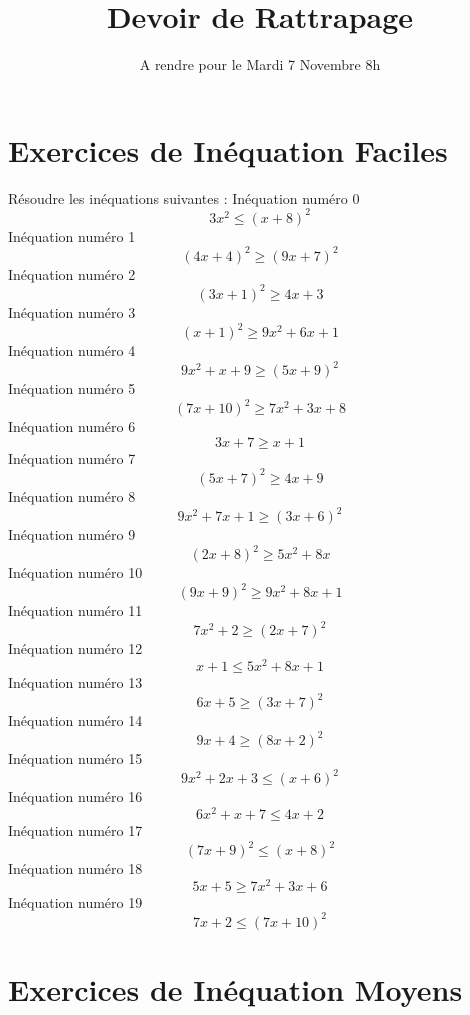 \documentclass{article}
\title{Devoir de Rattrapage}
\date{A rendre pour le Mardi 7 Novembre 8h}\usepackage{natbib}
\begin{document}
\maketitle
 \section{Exercices de In\'equation Faciles}

 R\'esoudre les in\'equations suivantes : 
In\'equation num\'ero 0 \[3 x^{2} \leq \left(x + 8\right)^{2}\]In\'equation num\'ero 1 \[\left(4 x + 4\right)^{2} \geq \left(9 x + 7\right)^{2}\]In\'equation num\'ero 2 \[\left(3 x + 1\right)^{2} \geq 4 x + 3\]In\'equation num\'ero 3 \[\left(x + 1\right)^{2} \geq 9 x^{2} + 6 x + 1\]In\'equation num\'ero 4 \[9 x^{2} + x + 9 \geq \left(5 x + 9\right)^{2}\]In\'equation num\'ero 5 \[\left(7 x + 10\right)^{2} \geq 7 x^{2} + 3 x + 8\]In\'equation num\'ero 6 \[3 x + 7 \geq x + 1\]In\'equation num\'ero 7 \[\left(5 x + 7\right)^{2} \geq 4 x + 9\]In\'equation num\'ero 8 \[9 x^{2} + 7 x + 1 \geq \left(3 x + 6\right)^{2}\]In\'equation num\'ero 9 \[\left(2 x + 8\right)^{2} \geq 5 x^{2} + 8 x\]In\'equation num\'ero 10 \[\left(9 x + 9\right)^{2} \geq 9 x^{2} + 8 x + 1\]In\'equation num\'ero 11 \[7 x^{2} + 2 \geq \left(2 x + 7\right)^{2}\]In\'equation num\'ero 12 \[x + 1 \leq 5 x^{2} + 8 x + 1\]In\'equation num\'ero 13 \[6 x + 5 \geq \left(3 x + 7\right)^{2}\]In\'equation num\'ero 14 \[9 x + 4 \geq \left(8 x + 2\right)^{2}\]In\'equation num\'ero 15 \[9 x^{2} + 2 x + 3 \leq \left(x + 6\right)^{2}\]In\'equation num\'ero 16 \[6 x^{2} + x + 7 \leq 4 x + 2\]In\'equation num\'ero 17 \[\left(7 x + 9\right)^{2} \leq \left(x + 8\right)^{2}\]In\'equation num\'ero 18 \[5 x + 5 \geq 7 x^{2} + 3 x + 6\]In\'equation num\'ero 19 \[7 x + 2 \leq \left(7 x + 10\right)^{2}\]
 \section{Exercices de In\'equation Moyens}
\end{document}
